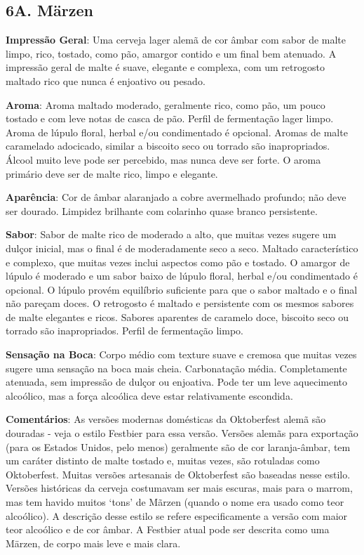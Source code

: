 \subsection*{6A. Märzen}
\textbf{Impressão Geral}: Uma cerveja lager alemã de cor âmbar com sabor de malte limpo, rico, tostado, como pão, amargor contido e um final bem atenuado. A impressão geral de malte é suave, elegante e complexa, com um retrogosto maltado rico que nunca é enjoativo ou pesado.

\textbf{Aroma}: Aroma maltado moderado, geralmente rico, como pão, um pouco tostado e com leve notas de casca de pão. Perfil de fermentação lager limpo. Aroma de lúpulo floral, herbal e/ou condimentado é opcional. Aromas de malte caramelado adocicado, similar a biscoito seco ou torrado são inapropriados. Álcool muito leve pode ser percebido, mas nunca deve ser forte. O aroma primário deve ser de malte rico, limpo e elegante.

\textbf{Aparência}: Cor de âmbar alaranjado a cobre avermelhado profundo; não deve ser dourado. Limpidez brilhante com colarinho quase branco persistente.

\textbf{Sabor}: Sabor de malte rico de moderado a alto, que muitas vezes sugere um dulçor inicial, mas o final é de moderadamente seco a seco. Maltado característico e complexo, que muitas vezes inclui aspectos como pão e tostado. O amargor de lúpulo é moderado e um sabor baixo de lúpulo floral, herbal e/ou condimentado é opcional. O lúpulo provém equilíbrio suficiente para que o sabor maltado e o final não pareçam doces. O retrogosto é maltado e persistente com os mesmos sabores de malte elegantes e ricos. Sabores aparentes de caramelo doce, biscoito seco ou torrado são inapropriados. Perfil de fermentação limpo.

\textbf{Sensação na Boca}: Corpo médio com texture suave e cremosa que muitas vezes sugere uma sensação na boca mais cheia. Carbonatação média. Completamente atenuada, sem impressão de dulçor ou enjoativa. Pode ter um leve aquecimento alcoólico, mas a força alcoólica deve estar relativamente escondida.

\textbf{Comentários}: As versões modernas domésticas da Oktoberfest alemã são douradas - veja o estilo Festbier para essa versão. Versões alemãs para exportação (para os Estados Unidos, pelo menos) geralmente são de cor laranja-âmbar, tem um caráter distinto de malte tostado e, muitas vezes, são rotuladas como Oktoberfest. Muitas versões artesanais de Oktoberfest são baseadas nesse estilo. Versões históricas da cerveja costumavam ser mais escuras, mais para o marrom, mas tem havido muitos ‘tons’ de Mãrzen (quando o nome era usado como teor alcoólico). A descrição desse estilo se refere especificamente a versão com maior teor alcoólico e de cor âmbar. A Festbier atual pode ser descrita como uma Märzen, de corpo mais leve e mais clara.

